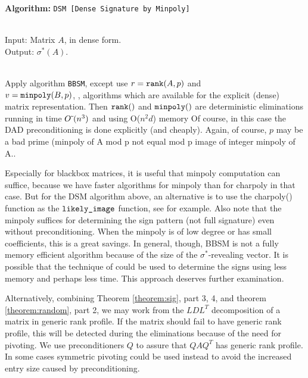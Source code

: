 \documentclass{acm_proc_article-sp}
\makeatletter
\newcommand{\softO}{{O\mskip1mu\tilde{\,}\mskip1mu}}
\newcommand{\rank}[1]{\ensuremath{\mbox{\tt rank}(#1)}}
\newcommand{\minpoly}[1]{\ensuremath{\mbox{\tt minpoly}(#1)}}
\newlength{\Stmtindent}
\newenvironment{algorithm}[1]
{
   \setlength{\Stmtindent}{10pt}
   \def\Stmt{\@ifnextchar[{\@Stmt}{\@Stmt[]}}
   \def\@Stmt[##1]{\par\hspace*{\Stmtindent}\llap{##1\enspace\hfil}%
                   \hangindent\Stmtindent\ignorespaces}
   \def\Inspec{\par\hangindent0pt\noindent%
               \rlap{\@alginheader}\gdef\@alginheader{}%
               \hangindent1.0\Stmtindent\ignorespaces}
   \def\Outspec{\par\hangindent0pt\noindent%
                \rlap{\@algoutheader}\gdef\@algoutheader{}%
                \hangindent1.0\Stmtindent\ignorespaces}
   \def\Procspec{\par\hangindent0pt\noindent%
                \rlap{\@algprocheader}\gdef\@algprocheader{}%
                \hangindent1.0\Stmtindent\ignorespaces
				}
   \def\>{\advance\hangindent\Stmtindent\hspace*{\Stmtindent}\ignorespaces}
   \def\@alginheader{Input:}
   \def\@algoutheader{Output:}
   \def\@algprocheader{Method:}

   \parindent=0pt
   \parskip=1pt

   \medbreak\par {\bf Algorithm: }{\tt #1}
}
{\smallbreak}
\newcommand{\reveal}{\ensuremath{\mbox{\tt likely\_image}}}
\newcommand{\signature}{\ensuremath{\sigma^{*}}}
\makeatother
\begin{document}
\begin{algorithm} {DSM [Dense Signature by Minpoly] \label{dsm}}
\\Input: Matrix $A$, in dense form.
\\Output: $\signature(A)$.
\Procspec \\
Apply algorithm {\tt BBSM}, except use 
$r = \rank{A, p}$ \cite{DumasGiorgiPernet:2004:issac} and 
\\$v = \minpoly{B, p}$, \cite{Pernet03}, %
algorithms which
are 
available for the explicit (dense) matrix representation.
Then $\rank{}$ and $\minpoly{}$ are deterministic eliminations running in time $\softO(n^3)$
and using O($n^2 d$) memory 
Of course, in this case the DAD preconditioning is done 
explicitly (and cheaply).
Again, of course, $p$ may be a bad prime (minpoly of A mod p not equal mod p 
image of integer minpoly of A.. 
\end{algorithm} 

Especially for blackbox matrices, it is useful that minpoly computation can suffice,
because we have faster algorithms for minpoly than for charpoly in that case.
But for the DSM algorithm above, an alternative is to use the charpoly() function as the $\reveal$ function, see \cite{Pernet03} for example.
Also note that the minpoly suffices for determining the sign pattern (not full signature)
even without preconditioning.  
When the minpoly is of low degree or has small coefficients, this is a great savings.
In general, though, BBSM is not a fully memory efficient algorithm because of the size of the 
\signature-revealing vector.  It is possible that the technique of \cite{BEPP97} could
be used to determine the signs using less memory and perhaps less time.  This approach
deserves further examination.

Alternatively, 
combining Theorem \ref{theorem:sig}, part 3, 4, 
and theorem \ref{theorem:random},
part 2,  we may work from 
the $LDL^T$ decomposition of a matrix in generic rank profile.  
If the matrix should fail to have generic rank profile, this will be detected during
the eliminations because of the need for pivoting.
We use preconditioners $Q$ to assure that $QAQ^T$ has generic
rank profile.
In some cases symmetric pivoting could be used instead to avoid the 
increased entry size caused by preconditioning.  
\end{document}

